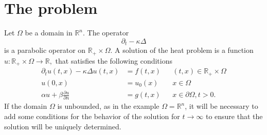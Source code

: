 %
%
%
\section{The problem}
Let $\Omega$ be a domain in $\mathbb R^n$.
The operator
\[
\partial_t-\kappa\Delta
\]
is a parabolic operator on $\mathbb R_+\times\Omega$.
A solution of the heat problem is a function
$u\colon\mathbb R_+\times\Omega\to\mathbb R,$
that satisfies the following conditions
\begin{align*}
\partial_tu(t,x)-\kappa\Delta u(t,x)&=f(t,x)&&(t,x)\in\mathbb R_+\times\Omega
\\
u(0,x)&=u_0(x)&&x\in\Omega
\\
\alpha u+\beta\frac{\partial u}{\partial n}&=g(t, x)&&x\in\partial\Omega, t>0.
\end{align*}
If the domain $\Omega$ is unbounded, as in the example $\Omega=\mathbb R^n$,
it will be necessary to add some conditions for the behavior of the
solution for $t\to\infty$ to ensure that the solution will be 
uniquely determined.

